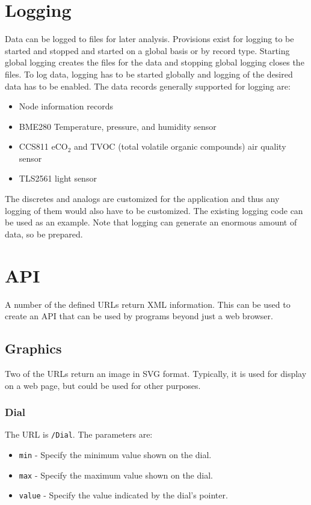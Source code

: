 \documentclass[10pt, openany, draft]{article}
\begin{document}
\section{Logging}
Data can be logged to files for later analysis.  Provisions exist for logging to be started and stopped and started on a global basis or by record type.  Starting global logging creates the files for the data and stopping global logging closes the files.  To log data, logging has to be started globally and logging of the desired data has to be enabled.  The data records generally supported for logging are:
\begin{itemize}
  \item Node information records
  \item BME280 Temperature, pressure, and humidity sensor
  \item CCS811 eCO$_2$ and TVOC (total volatile organic compounds) air quality sensor
  \item TLS2561 light sensor
\end{itemize}
The discretes and analogs are customized for the application and thus any logging of them would also have to be customized.  The existing logging code can be used as an example.  Note that logging can generate an enormous amount of data, so be prepared.
\section{API}
A number of the defined URLs return XML information.  This can be used to create an API that can be used by programs beyond just a web browser.

\subsection{Graphics}
Two of the URLs return an image in SVG format.  Typically, it is used for display on a web page, but could be used for other purposes.

\subsubsection{Dial}
The URL is \texttt{/Dial}.  The parameters are:
\begin{itemize}
  \item \texttt{min} - Specify the minimum value shown on the dial.
  \item \texttt{max} - Specify the maximum value shown on the dial.
  \item \texttt{value} - Specify the value indicated by the dial's pointer.
\end{itemize}
\end{document}
